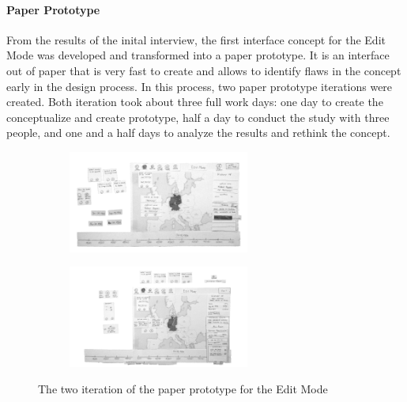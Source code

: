 

\paragraph{Paper Prototype} %
\label{par:paper_prototype}

From the results of the inital interview, the first interface concept for the Edit Mode was developed and transformed into a paper prototype. It is an interface out of paper that is very fast to create and allows to identify flaws in the concept early in the design process. In this process, two paper prototype iterations were created. Both iteration took about three full work days: one day to create the conceptualize and create prototype, half a day to conduct the study with three people, and one and a half days to analyze the results and rethink the concept.

\begin{figure}[H]
\centering
\begin{subfigure}{.5\textwidth}
  \centering
  \includegraphics[width=225px]{graphics/development/design_process/paper_prototype_1.png}
\end{subfigure}%
\begin{subfigure}{.5\textwidth}
  \centering
  \includegraphics[width=225px]{graphics/development/design_process/paper_prototype_2.png}
\end{subfigure}
\caption{The two iteration of the paper prototype for the Edit Mode}
\label{fig:paper_prototypes}
\end{figure}

